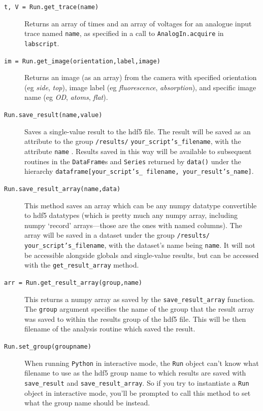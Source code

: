 \documentclass[a4paper,11pt,titlepage]{article}
\begin{document}
\begin{description}
\begin{description}
\item[\texttt{t, V = Run.get\_trace(name)}] Returns an array of times and an array of voltages for an analogue input trace named \texttt{name}, as specified in a call to \texttt{AnalogIn.acquire} in \texttt{labscript}.

\item[\texttt{im = Run.get\_image(orientation,label,image)}] Returns an image (as an array) from the camera with specified orientation (eg \emph{side}, \emph{top}), image label (eg \emph{fluorescence}, \emph{absorption}), and specific image name (eg \emph{OD}, \emph{atoms}, \emph{flat}).

\item[\texttt{Run.save\_result(name,value)}] Saves a single-value result to the hdf5 file. The result will be saved as an attribute to the group \texttt{/results/} \texttt{your\_script's\_filename}, with the attribute \texttt{name} . Results saved in this way will be available to subsequent routines in the \texttt{DataFrame}s and \texttt{Series} returned by \texttt{data()} under the hierarchy \texttt{dataframe[your\_script's\_ filename, your\_result's\_name]}.

\item[\texttt{Run.save\_result\_array(name,data)}] This method saves an array which can be any numpy datatype convertible to hdf5 datatypes (which is pretty much any numpy array, including numpy `record' arrays---those are the ones with named columns). The array will be saved in a dataset under the group \texttt{/results/} \texttt{your\_script's\_filename}, with the dataset's name being \texttt{name}. It will not be accessible alongside globals and single-value results, but can be accessed with the \texttt{get\_result\_array} method.

\item[\texttt{arr = Run.get\_result\_array(group,name)}] This returns a numpy array as saved by the \texttt{save\_result\_array} function. The \texttt{group} argument specifies the name of the group that the result array was saved to within the results group of the hdf5 file. This will be then filename of the analysis routine which saved the result. 

\item[\texttt{Run.set\_group(groupname)}] When running \texttt{Python} in interactive mode, the \texttt{Run} object can't know what filename to use as the hdf5 group name to which results are saved with \texttt{save\_result} and \texttt{save\_result\_array}. So if you try to instantiate a \texttt{Run} object in interactive mode, you'll be prompted to call this method to set what the group name should be instead.


\end{description}
\end{description}
\end{document}
